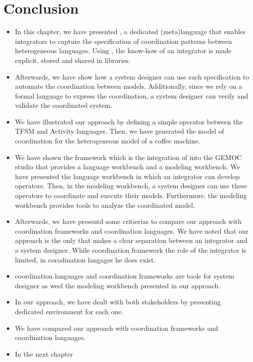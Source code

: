 \section{Conclusion}
\begin{itemize}
	
	\item In this chapter, we have presented \bcool, a dedicated (meta)language that enables integrators to capture the specification of coordination patterns between heterogeneous languages. Using \bcool, the know-how of an integrator is made explicit, stored and shared in libraries.

	\item Afterwards, we have show how a system designer can use such specification to automate the coordination between models. Additionally, since we rely on a formal language to express the coordination, a system designer can verify and validate the coordinated system.  
	
	\item We have illustrated our approach by defining a simple operator between the TFSM and Activity languages. Then, we have generated the model of coordination for the heterogeneous model of a coffee machine. 
	
	\item We have shown the \bcool framework which is the integration of \bcool into the GEMOC studio that provides a language workbench and a modeling workbench. We have presented the language workbench in which an integrator can develop \bcool operators. Then, in the modeling workbench, a system designer can use these operators to coordinate and execute their models. Furthermore, the modeling workbench provides tools to analyze the coordinated model.  
	
	\item Afterwards, we have presentd some critierias to compare our approach with coordination frameworks and coordination languages. We have noted that our approach is the only that makes a clear separation between an integrator and a system designer. While coordination framework the role of the integrator is limited, in corodination langages he does exist.
	\item coordination languages and coordination frameworks are tools for system designer as weel the modeling workbench presented in our approach. 
	\item In our approach, we have dealt with both stakeholders by presenting dedicated environment for each one.  
	
	\item We have compared our approach with coordination frameworks and coordination languages.    

	\item In the next chapter
\end{itemize}


